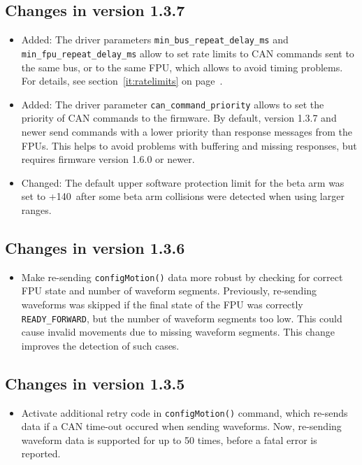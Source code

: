\documentclass[11pt,a4paper]{scrartcl}
\begin{document}
\subsection*{Changes in version 1.3.7}
\begin{itemize}
\item 
  Added: The driver parameters \texttt{min\_bus\_repeat\_delay\_ms} and
  \texttt{min\_fpu\_repeat\_delay\_ms} allow to set rate limits to CAN
  commands sent to the same bus, or to the same FPU, which allows to
  avoid timing problems. For details, see section~\ref{it:ratelimits}
  on page~\pageref{it:ratelimits}.
  
\item Added: The driver parameter \texttt{can\_command\_priority} allows to
  set the priority of CAN commands to the firmware. By default,
  version 1.3.7 and newer send commands with a lower priority than
  response messages from the FPUs. This helps to avoid problems with
  buffering and missing responses, but requires firmware version 1.6.0
  or newer.
  
\item Changed: The default upper software protection limit for the
  beta arm was set to +140\degree\ after some beta arm collisions were
  detected when using larger ranges.
\end{itemize}


\subsection*{Changes in version 1.3.6}
\begin{itemize}
\item Make re-sending \texttt{configMotion()} data more robust by
  checking for correct FPU state and number of waveform segments.
  Previously, re-sending waveforms was skipped if the final state of
  the FPU was correctly \texttt{READY\_FORWARD}, but the number of
  waveform segments too low. This could cause invalid movements due to
  missing waveform segments. This change improves the detection of
  such cases.
\end{itemize}

\subsection*{Changes in version 1.3.5}
\begin{itemize}
\item Activate additional retry code in \texttt{configMotion()}
  command, which re-sends data if a CAN time-out occured when sending
  waveforms.  Now, re-sending waveform data is supported for up to 50
  times, before a fatal error is reported.
\end{itemize}
\end{document}
